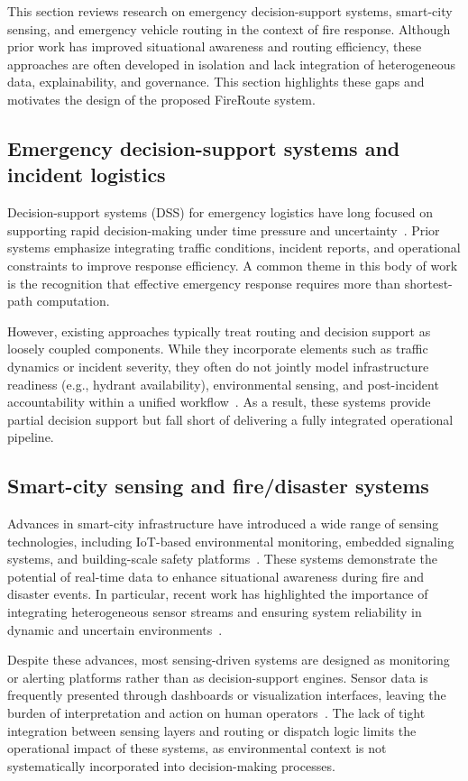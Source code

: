 This section reviews research on emergency decision-support systems, smart-city sensing, and emergency vehicle routing in the context of fire response. Although prior work has improved situational awareness and routing efficiency, these approaches are often developed in isolation and lack integration of heterogeneous data, explainability, and governance. This section highlights these gaps and motivates the design of the proposed FireRoute system.

\subsection{Emergency decision-support systems and incident logistics}
Decision-support systems (DSS) for emergency logistics have long focused on supporting rapid decision-making under time pressure and uncertainty~\cite{su142013423}. Prior systems emphasize integrating traffic conditions, incident reports, and operational constraints to improve response efficiency. A common theme in this body of work is the recognition that effective emergency response requires more than shortest-path computation.


However, existing approaches typically treat routing and decision support as loosely coupled components. While they incorporate elements such as traffic dynamics or incident severity, they often do not jointly model infrastructure readiness (e.g., hydrant availability), environmental sensing, and post-incident accountability within a unified workflow~\cite{fi17120574}. As a result, these systems provide partial decision support but fall short of delivering a fully integrated operational pipeline.

\subsection{Smart-city sensing and fire/disaster systems}
Advances in smart-city infrastructure have introduced a wide range of sensing technologies, including IoT-based environmental monitoring, embedded signaling systems, and building-scale safety platforms~\cite{REJEB2022100565}. These systems demonstrate the potential of real-time data to enhance situational awareness during fire and disaster events. In particular, recent work has highlighted the importance of integrating heterogeneous sensor streams and ensuring system reliability in dynamic and uncertain environments~\cite{SUN2026114440}.

Despite these advances, most sensing-driven systems are designed as monitoring or alerting platforms rather than as decision-support engines. Sensor data is frequently presented through dashboards or visualization interfaces, leaving the burden of interpretation and action on human operators~\cite{NAYAK2024783}. The lack of tight integration between sensing layers and routing or dispatch logic limits the operational impact of these systems, as environmental context is not systematically incorporated into decision-making processes.

